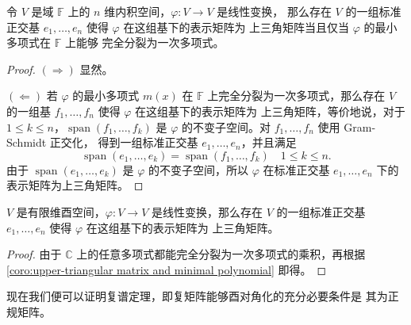 \documentclass[fontset=none,zihao=-4]{Notes}
\newcommand{\spa}[1]{\operatorname{span}\left(#1\right)}
\begin{document}
\begin{corollary}\label{coro:upper-triangular matrix and minimal polynomial}
  令 $V$ 是域 $\mathbb{F}$ 上的 $n$ 维内积空间，$\varphi:V\to V$ 是线性变换，
  那么存在 $V$ 的一组标准正交基 $e_1,\dots,e_n$ 使得 $\varphi$ 在这组基下的表示矩阵为
  上三角矩阵当且仅当 $\varphi$ 的最小多项式在 $\mathbb{F}$ 上能够
  完全分裂为一次多项式。
\end{corollary}
\begin{proof}
  $(\Rightarrow)$ 显然。

  $(\Leftarrow)$ 若 $\varphi$ 的最小多项式 $m(x)$ 在 $\mathbb{F}$
  上完全分裂为一次多项式，那么存在 $V$ 的一组基 $f_1,\dots,f_n$ 使得 $\varphi$ 在这组基下的表示矩阵为
  上三角矩阵，等价地说，对于 $1\leq k\leq n$，$\spa{f_1,\dots,f_k}$
  是 $\varphi$ 的不变子空间。对 $f_1,\dots,f_n$ 使用 Gram-Schmidt 正交化，
  得到一组标准正交基 $e_1,\dots,e_n$，并且满足 
  \[
    \spa{e_1,\dots,e_k}=\spa{f_1,\dots,f_k}\quad 1\leq k\leq n.  
  \]
  由于 $\spa{e_1,\dots,e_k}$ 是 $\varphi$ 的不变子空间，所以 
  $\varphi$ 在标准正交基 $e_1,\dots,e_n$ 下的表示矩阵为上三角矩阵。
\end{proof}

\begin{corollary}[Schur 定理]
  $V$ 是有限维酉空间，$\varphi:V\to V$ 是线性变换，那么存在 $V$ 的一组标准正交基 $e_1,\dots,e_n$ 使得 $\varphi$ 在这组基下的表示矩阵为
  上三角矩阵。
\end{corollary}
\begin{proof}
  由于 $\mathbb{C}$ 上的任意多项式都能完全分裂为一次多项式的乘积，再根据
  \autoref{coro:upper-triangular matrix and minimal polynomial} 即得。
\end{proof}

现在我们便可以证明复谱定理，即复矩阵能够酉对角化的充分必要条件是
其为正规矩阵。
\end{document}

